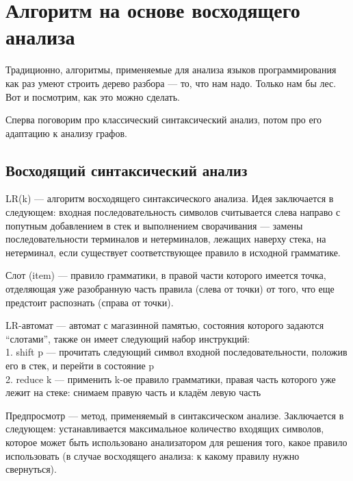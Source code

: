 \section{Алгоритм на основе восходящего анализа}

Традиционно, алгоритмы, применяемые для анализа языков программирования как раз умеют строить дерево разбора --- то, что нам надо.
Только нам бы лес.
Вот и посмотрим, как это можно сделать.

Сперва поговорим про классический синтаксический анализ, потом про его адаптацию к анализу графов.

\subsection{Восходящий синтаксический анализ}

LR(k) --- алгоритм восходящего синтаксического анализа. 
Идея заключается в следующем: входная последовательность символов считывается слева направо с попутным добавлением в стек и выполнением сворачивания --- замены последовательности терминалов и нетерминалов, лежащих наверху стека, на нетерминал, если существует соответствующее правило в исходной грамматике.

\begin{definition}
Слот (item) --- правило грамматики, в правой части которого имеется точка, отделяющая уже разобранную часть правила (слева от точки) от того, что еще предстоит распознать (справа от точки).
\end{definition}

\begin{definition}
LR-автомат --- автомат с магазинной памятью, состояния которого задаются ``слотами'', также он имеет следующий набор инструкций: \\
1. shift p --- прочитать следующий символ входной последовательности, положив его в стек, и перейти в состояние p \\
2. reduce k --- применить k-ое правило грамматики, правая часть которого уже лежит на стеке: снимаем правую часть и кладём левую часть
\end{definition}

\begin{definition}
Предпросмотр --- метод, применяемый в синтаксическом анализе. Заключается в следующем: устанавливается максимальное количество входящих символов, которое может быть использовано анализатором для решения того, какое правило использовать (в случае восходящего анализа: к какому правилу нужно свернуться).
\end{definition}

